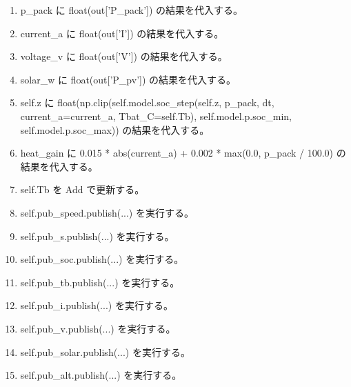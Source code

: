 \documentclass[a4paper,11pt]{article}
\begin{document}
\begin{enumerate}[leftmargin=1.8em]
\item p\_pack に float(out['P\_pack']) の結果を代入する。
\item current\_a に float(out['I']) の結果を代入する。
\item voltage\_v に float(out['V']) の結果を代入する。
\item solar\_w に float(out['P\_pv']) の結果を代入する。
\item self.z に float(np.clip(self.model.soc\_step(self.z, p\_pack, dt, current\_a=current\_a, Tbat\_C=self.Tb), self.model.p.soc\_min, self.model.p.soc\_max)) の結果を代入する。
\item heat\_gain に 0.015 * abs(current\_a) + 0.002 * max(0.0, p\_pack / 100.0) の結果を代入する。
\item self.Tb を Add で更新する。
\item self.pub\_speed.publish(...) を実行する。
\item self.pub\_s.publish(...) を実行する。
\item self.pub\_soc.publish(...) を実行する。
\item self.pub\_tb.publish(...) を実行する。
\item self.pub\_i.publish(...) を実行する。
\item self.pub\_v.publish(...) を実行する。
\item self.pub\_solar.publish(...) を実行する。
\item self.pub\_alt.publish(...) を実行する。
            \end{enumerate}
\end{document}
